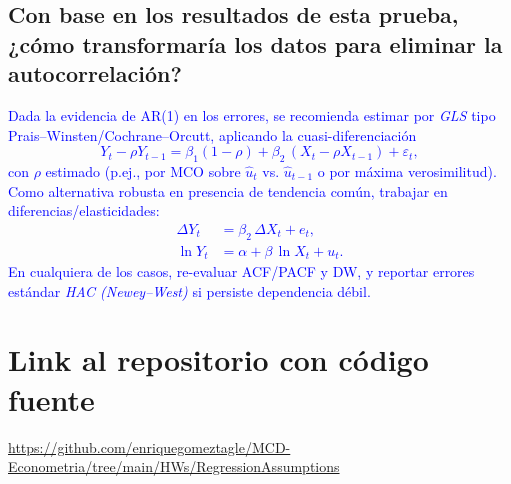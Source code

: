 \documentclass[10pt]{article}
\begin{document}
\subsection{Con base en los resultados de esta prueba, ¿cómo transformaría los datos para eliminar la autocorrelación?}
    \textcolor{blue}{
        Dada la evidencia de AR(1) en los errores, se recomienda estimar por \emph{GLS} tipo Prais--Winsten/Cochrane--Orcutt, aplicando la cuasi-diferenciación
        \begin{equation*}
        Y_t-\rho Y_{t-1} = \beta_1(1-\rho) + \beta_2\,(X_t-\rho X_{t-1}) + \varepsilon_t,
        \end{equation*}
        con $\rho$ estimado (p.ej., por MCO sobre $\hat u_t$ vs. $\hat u_{t-1}$ o por máxima verosimilitud). Como alternativa robusta en presencia de tendencia común, trabajar en diferencias/elasticidades:
        \begin{align*}
        \Delta Y_t &= \beta_2\,\Delta X_t + e_t,\\
        \ln Y_t &= \alpha + \beta\,\ln X_t + u_t. 
        \end{align*}
        En cualquiera de los casos, re-evaluar ACF/PACF y DW, y reportar errores estándar \emph{HAC (Newey--West)} si persiste dependencia débil.
    }
\section{Link al repositorio con código fuente}
\url{https://github.com/enriquegomeztagle/MCD-Econometria/tree/main/HWs/RegressionAssumptions}
\end{document}
